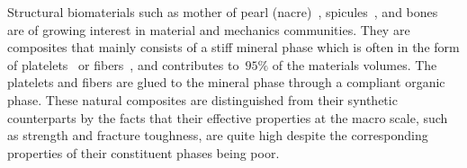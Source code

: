 \documentclass[preprint,12pt,times]{elsarticle}
\numberwithin{equation}{section}
\renewcommand{\>}{$\Rightarrow$}
\begin{document}






Structural biomaterials such as mother of pearl (nacre)~\cite{jackson1988mechanical}, spicules~\cite{monn2015new}, and bones~\cite{wegst2015bioinspired} are of growing interest in material and mechanics communities.
%
They are composites that mainly consists of a stiff mineral phase which is often in the form of platelets~\cite{currey1977mechanical, meyers2008biological, espinosa2011tablet} or fibers~\cite{Aizenberg2005, zhang2011structure, li2015hierarchical}, and contributes to~$95\%$ of the materials volumes.
%
The platelets and fibers are glued to the mineral phase through a compliant organic phase.
%
These natural composites are distinguished from their synthetic counterparts by the facts that their effective properties at the macro scale, such as strength and fracture toughness, are quite high despite the corresponding properties of their constituent phases being poor.
%
\end{document}
